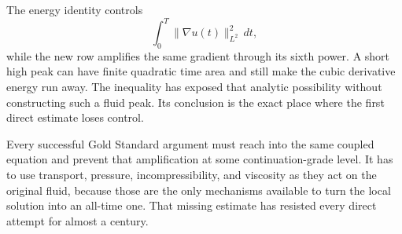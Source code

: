 The energy identity controls
\[
  \int_0^T\lVert\nabla u(t)\rVert_{L^2}^2\,dt,
\]
while the new row amplifies the same gradient through its sixth power.
A short high peak can have finite quadratic time area and still make the cubic derivative energy run away.
The inequality has exposed that analytic possibility without constructing such a fluid peak.
Its conclusion is the exact place where the first direct estimate loses control.

Every successful Gold Standard argument must reach into the same coupled equation and prevent that amplification at some continuation-grade level.
It has to use transport, pressure, incompressibility, and viscosity as they act on the original fluid, because those are the only mechanisms available to turn the local solution into an all-time one.
That missing estimate has resisted every direct attempt for almost a century.
